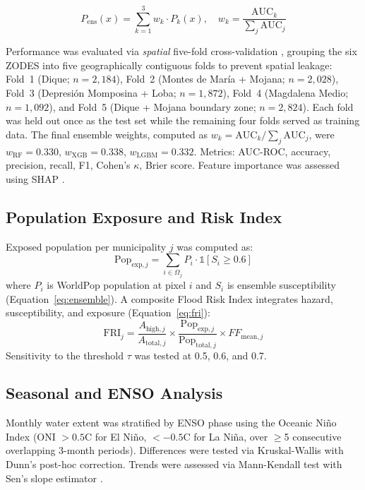 \documentclass{article}
\begin{document}
\begin{equation}
    P_{\text{ens}}(x) = \sum_{k=1}^{3} w_k \cdot P_k(x), \quad w_k = \frac{\text{AUC}_k}{\sum_{j} \text{AUC}_j}
    \label{eq:ensemble}
\end{equation}

Performance was evaluated via \textit{spatial} five-fold cross-validation \citep{Roberts2017}, grouping the six ZODES into five geographically contiguous folds to prevent spatial leakage: Fold~1 (Dique; $n = 2{,}184$), Fold~2 (Montes de Mar\'ia + Mojana; $n = 2{,}028$), Fold~3 (Depresi\'on Momposina + Loba; $n = 1{,}872$), Fold~4 (Magdalena Medio; $n = 1{,}092$), and Fold~5 (Dique + Mojana boundary zone; $n = 2{,}824$). Each fold was held out once as the test set while the remaining four folds served as training data. The final ensemble weights, computed as $w_k = \text{AUC}_k / \sum_j \text{AUC}_j$, were $w_{\text{RF}} = 0.330$, $w_{\text{XGB}} = 0.338$, $w_{\text{LGBM}} = 0.332$. Metrics: AUC-ROC, accuracy, precision, recall, F1, Cohen's $\kappa$, Brier score. Feature importance was assessed using SHAP \citep{Lundberg2017}.

\subsection{Population Exposure and Risk Index}

Exposed population per municipality $j$ was computed as:
\begin{equation}
    \text{Pop}_{\text{exp},j} = \sum_{i \in \Omega_j} P_i \cdot \mathbb{1}[S_i \geq 0.6]
    \label{eq:pop_exposure}
\end{equation}
where $P_i$ is WorldPop population at pixel $i$ \citep{Stevens2015} and $S_i$ is ensemble susceptibility (Equation~\ref{eq:ensemble}). A composite Flood Risk Index integrates hazard, susceptibility, and exposure (Equation~\ref{eq:fri}):
\begin{equation}
    \text{FRI}_j = \frac{A_{\text{high},j}}{A_{\text{total},j}} \times \frac{\text{Pop}_{\text{exp},j}}{\text{Pop}_{\text{total},j}} \times FF_{\text{mean},j}
    \label{eq:fri}
\end{equation}
Sensitivity to the threshold $\tau$ was tested at 0.5, 0.6, and 0.7.

\subsection{Seasonal and ENSO Analysis}

Monthly water extent was stratified by ENSO phase using the Oceanic Ni\~no Index (ONI $> 0.5$\textdegree{}C for El Ni\~no, $< -0.5$\textdegree{}C for La Ni\~na, over $\geq$5 consecutive overlapping 3-month periods). Differences were tested via Kruskal-Wallis with Dunn's post-hoc correction. Trends were assessed via Mann-Kendall test \citep{Mann1945} with Sen's slope estimator \citep{Sen1968}.
\end{document}
